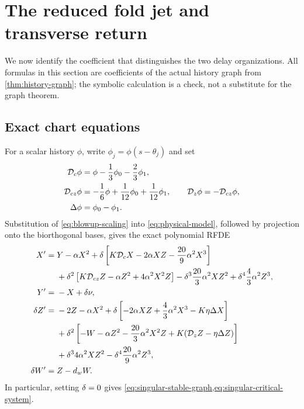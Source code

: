 \section{The reduced fold jet and transverse return}
\label{sec:fold-jet}

We now identify the coefficient that distinguishes the two delay
organizations.  All formulas in this section are coefficients of the actual
history graph from \cref{thm:history-graph}; the symbolic calculation is a
check, not a substitute for the graph theorem.

\subsection{Exact chart equations}

For a scalar history \(\phi\), write \(\phi_j=\phi(s-\theta_j)\) and set
\begin{equation}
\label{eq:delay-operators}
\begin{aligned}
 \mathcal D_c\phi&=\phi-\frac13\phi_0-\frac23\phi_1,\\
 \mathcal D_{cz}\phi&=-\frac16\phi+\frac1{12}\phi_0+\frac1{12}\phi_1,
 \qquad \mathcal D_z\phi=-\mathcal D_{cz}\phi,\\
 \Delta\phi&=\phi_0-\phi_1.
\end{aligned}
\end{equation}
Substitution of \cref{eq:blowup-scaling} into
\cref{eq:physical-model}, followed by projection onto the biorthogonal
bases, gives the exact polynomial RFDE
\begin{equation}
\label{eq:exact-chart}
\begin{aligned}
X'={}&Y-\alpha X^2
 +\delta\left[K\mathcal D_cX-2\alpha XZ-\frac{20}{9}\alpha^2X^3\right]\\
&+\delta^2\left[K\mathcal D_{cz}Z-\alpha Z^2+4\alpha^2X^2Z\right]
-\delta^3\frac{20}{3}\alpha^2XZ^2
+\delta^4\frac43\alpha^2Z^3,\\
Y'={}&-X+\delta\nu,\\
\delta Z'={}&-2Z-\alpha X^2
+\delta\left[-2\alpha XZ+\frac43\alpha^2X^3-K\eta\Delta X\right]\\
&+\delta^2\left[-W-\alpha Z^2-\frac{20}{3}\alpha^2X^2Z
              +K(\mathcal D_zZ-\eta\Delta Z)\right]\\
&+\delta^3 4\alpha^2XZ^2-\delta^4\frac{20}{9}\alpha^2Z^3,\\
\delta W'={}&Z-d_wW.
\end{aligned}
\end{equation}
In particular, setting \(\delta=0\) gives
\cref{eq:singular-stable-graph,eq:singular-critical-system}.

